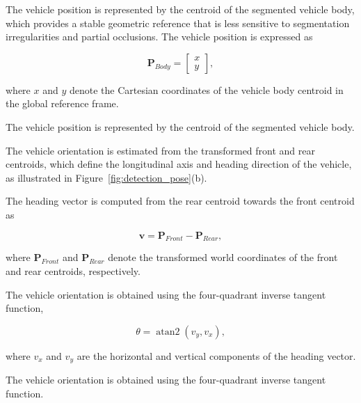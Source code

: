 The vehicle position is represented by the centroid of the segmented vehicle body, which provides a stable geometric reference that is less sensitive to segmentation irregularities and partial occlusions. The vehicle position is expressed as

\begin{equation}
	\mathbf{P}_{Body}=
	\begin{bmatrix}
		x\\
		y
	\end{bmatrix},
	\label{eq:vehicle_position}
\end{equation}

where $x$ and $y$ denote the Cartesian coordinates of the vehicle body centroid in the global reference frame.

The vehicle position is represented by the centroid of the segmented vehicle body.

The vehicle orientation is estimated from the transformed front and rear centroids, which define the longitudinal axis and heading direction of the vehicle, as illustrated in Figure~\ref{fig:detection_pose}(b).

The heading vector is computed from the rear centroid towards the front centroid as

\begin{equation}
	\mathbf{v}
	=
	\mathbf{P}_{Front}
	-
	\mathbf{P}_{Rear},
	\label{eq:heading_vector}
\end{equation}

where $\mathbf{P}_{Front}$ and $\mathbf{P}_{Rear}$ denote the transformed world coordinates of the front and rear centroids, respectively.

The vehicle orientation is obtained using the four-quadrant inverse tangent function,

\begin{equation}
	\theta
	=
	\operatorname{atan2}(v_y,v_x),
	\label{eq:heading}
\end{equation}

where $v_x$ and $v_y$ are the horizontal and vertical components of the heading vector.

The vehicle orientation is obtained using the four-quadrant inverse tangent function.

